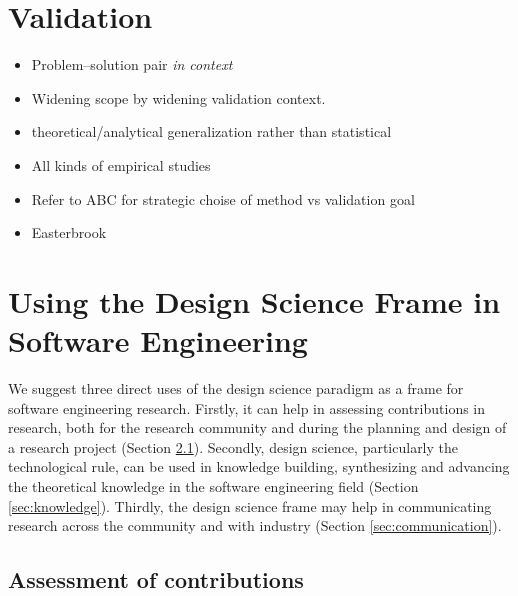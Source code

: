 \documentclass[graybox]{svmult}
\begin{document}
\section{Validation}
\begin{itemize}
\item Problem--solution pair \emph{in context}
\item Widening scope by widening validation context. 
\item theoretical/analytical generalization rather than statistical 
\item All kinds of empirical studies \cite{easterbrook_selecting_2008}\cite{Runeson12Case,WohlinExpBook12}
\item Refer to ABC \cite{StolABC18} for strategic choise of method vs validation goal 
\item Easterbrook \cite{easterbrook_selecting_2008}
\end{itemize}






\section{Using the Design Science Frame in Software Engineering}
We suggest three direct uses of the design science paradigm as a frame for software engineering research. Firstly, it can help in assessing contributions in research, both for the research community and during the planning and design of a research project (Section \ref{sec:assessment}). Secondly, design science, particularly the technological rule, can be used in knowledge building, synthesizing and advancing the theoretical knowledge in the software engineering field (Section \ref{sec:knowledge}). Thirdly, the design science frame may help in communicating research across the community and with industry (Section \ref{sec:communication}).

\subsection{Assessment of contributions}
\label{sec:assessment}
\end{document}
